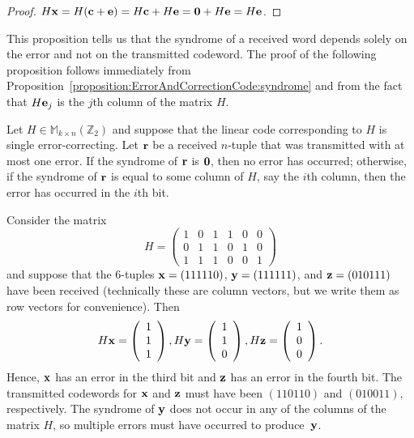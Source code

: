  \begin{proof}
$H{\bold x} = H({\bold c} +{\bold e}) = H{\bold c} + H{\bold e} =
{\bold 0} + H{\bold e} = H{\bold e}$.  
\end{proof}
 
 
This proposition tells us that the syndrome of a received word depends
solely on the error and not on the transmitted codeword. The proof of the
following proposition follows immediately from Proposition~\ref{proposition:ErrorAndCorrectionCode:syndrome} and from
the fact that $H{\bold e}_j$ is the $j$th column of the matrix $H$.
 
 \begin{prop}{}
Let $H \in \mathbb{M}_{ k \times n} ( \mathbb{Z}_2)$ and suppose that the
linear code corresponding to $H$ is single error-correcting. Let
${\bold r}$ be a received $n$-tuple that was transmitted with at most
one error. If the syndrome of ${\bold r}$ is ${\bold 0}$, then no
error has occurred; otherwise, if the syndrome of ${\bold r}$ is equal
to some column of $H$, say the $i$th column, then the error has
occurred in the $i$th bit.  
\end{prop}
 
 \begin{example}{}
Consider the matrix
\[
H =
\left(
\begin{array}{cccccc}
1 & 0 & 1 & 1 & 0 & 0 \\
0 & 1 & 1 & 0 & 1 & 0 \\
1 & 1 & 1 & 0 & 0 & 1
\end{array}
\right)
\]
and suppose that the  6-tuples ${\bold x} = (111110)$,
${\bold y} = (111111)$, and ${\bold z} = (010111)$
have been received (technically these are column vectors, but we write them as row vectors for convenience). Then  
\[
H{\bold x} =
\left(
\begin{array}{c} 1 \\ 1 \\ 1 \end{array}
\right),
H{\bold y} =
\left(
\begin{array}{c} 1 \\ 1 \\ 0 \end{array}
\right),
H{\bold z} =
\left(
\begin{array}{c} 1 \\ 0 \\ 0 \end{array}
\right).
\]
Hence, ${\bold x}$ has an error in the third bit and ${\bold z}$ has
an error in the fourth bit. The transmitted codewords for ${\bold x}$
and ${\bold z}$ must have been $(110110)$ and $(010011)$,
respectively. The syndrome of ${\bold y}$ does not occur in any of the
columns of the matrix $H$, so multiple
errors must have occurred to produce~${\bold y}$.
\end{example}
 
